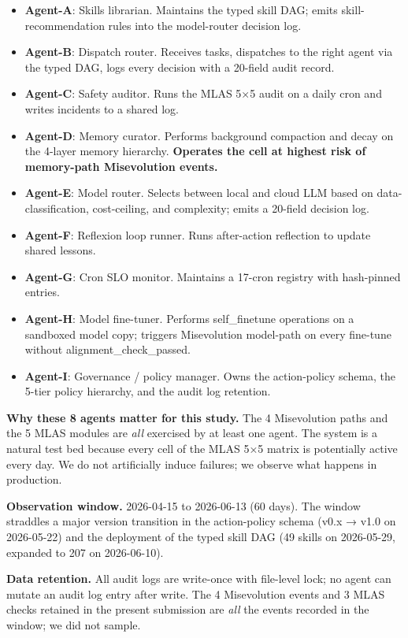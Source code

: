 \begin{itemize}
\tightlist
\item
  \textbf{Agent-A}: Skills librarian. Maintains the typed skill DAG;
  emits skill-recommendation rules into the model-router decision log.
\item
  \textbf{Agent-B}: Dispatch router. Receives tasks, dispatches to the
  right agent via the typed DAG, logs every decision with a 20-field
  audit record.
\item
  \textbf{Agent-C}: Safety auditor. Runs the MLAS 5×5 audit on a daily
  cron and writes incidents to a shared log.
\item
  \textbf{Agent-D}: Memory curator. Performs background compaction and
  decay on the 4-layer memory hierarchy. \textbf{Operates the cell at
  highest risk of memory-path Misevolution events.}
\item
  \textbf{Agent-E}: Model router. Selects between local and cloud LLM
  based on data-classification, cost-ceiling, and complexity; emits a
  20-field decision log.
\item
  \textbf{Agent-F}: Reflexion loop runner. Runs after-action reflection
  to update shared lessons.
\item
  \textbf{Agent-G}: Cron SLO monitor. Maintains a 17-cron registry with
  hash-pinned entries.
\item
  \textbf{Agent-H}: Model fine-tuner. Performs self\_finetune operations
  on a sandboxed model copy; triggers Misevolution model-path on every
  fine-tune without alignment\_check\_passed.
\item
  \textbf{Agent-I}: Governance / policy manager. Owns the action-policy
  schema, the 5-tier policy hierarchy, and the audit log retention.
\end{itemize}

\textbf{Why these 8 agents matter for this study.} The 4 Misevolution
paths and the 5 MLAS modules are \emph{all} exercised by at least one
agent. The system is a natural test bed because every cell of the MLAS
5×5 matrix is potentially active every day. We do not artificially
induce failures; we observe what happens in production.

\textbf{Observation window.} 2026-04-15 to 2026-06-13 (60 days). The
window straddles a major version transition in the action-policy schema
(v0.x → v1.0 on 2026-05-22) and the deployment of the typed skill DAG
(49 skills on 2026-05-29, expanded to 207 on 2026-06-10).

\textbf{Data retention.} All audit logs are write-once with file-level
lock; no agent can mutate an audit log entry after write. The 4
Misevolution events and 3 MLAS checks retained in the present submission
are \emph{all} the events recorded in the window; we did not sample.

